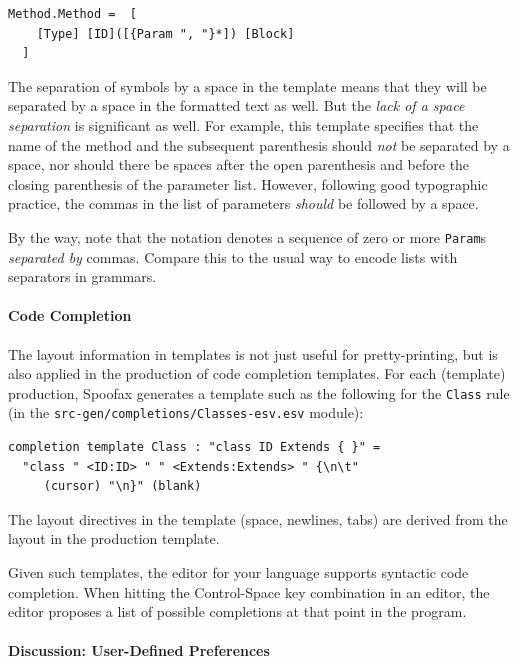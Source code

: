 \begin{lstlisting}[language=SDF]
  Method.Method =  [
  	[Type] [ID]([{Param ", "}*]) [Block]
  ]
\end{lstlisting}

The separation of symbols by a space in the template means that they will be
separated by a space in the formatted text as well. But the \emph{lack of a
space separation} is significant as well. For example, this template specifies
that the name of the method and the subsequent parenthesis should \emph{not} be
separated by a space, nor should there be spaces after the open parenthesis and
before the closing parenthesis of the parameter list. However, following good
typographic practice, the commas in the list of parameters \emph{should} be
followed by a space.

By the way, note that the notation  denotes a sequence
of zero or more \texttt{Param}s \emph{separated by} commas. Compare this to the
usual way to encode lists with separators in grammars.

\paragraph{Code Completion}

The layout information in templates is not just useful for pretty-printing, but
is also applied in the production of code completion templates. For each
(template) production, Spoofax generates a template such as the following for
the \texttt{Class} rule (in the \texttt{src-gen/completions/Classes-esv.esv}
module):

\begin{lstlisting}[language=ESV]
completion template Class : "class ID Extends { }" =
  "class " <ID:ID> " " <Extends:Extends> " {\n\t" 
     (cursor) "\n}" (blank)  
\end{lstlisting}

The layout directives in the template (space, newlines, tabs) are derived from
the layout in the production template.

Given such templates, the editor for your language supports syntactic code
completion. When hitting the Control-Space key combination in an editor, the
editor proposes a list of possible completions at that point in the program.

\paragraph{Discussion: User-Defined Preferences}

